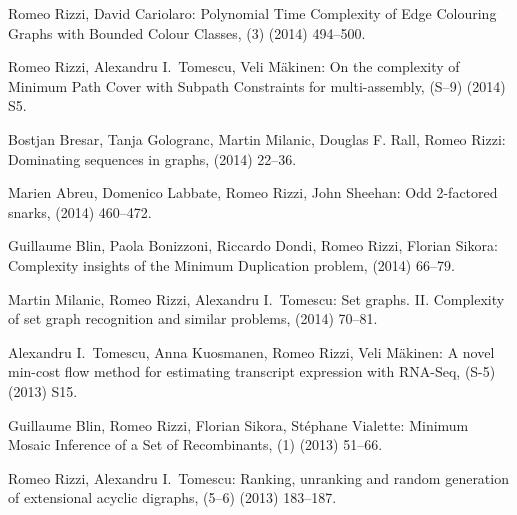 \begin{etaremune}
  \item {\sc Romeo Rizzi, David Cariolaro:}
   \newblock  Polynomial Time Complexity of Edge Colouring Graphs with Bounded Colour Classes,
   (3) (2014) 494--500.

  \item {\sc Romeo Rizzi, Alexandru I.~Tomescu, Veli M\"akinen:}
   \newblock  On the complexity of Minimum Path Cover with Subpath Constraints for multi-assembly,
   (S--9) (2014) S5.

  \item {\sc Bostjan Bresar, Tanja Gologranc, Martin Milanic, Douglas F. Rall, Romeo Rizzi:}
   \newblock  Dominating sequences in graphs,
    (2014) 22--36.

  \item {\sc Marien Abreu, Domenico Labbate, Romeo Rizzi, John Sheehan:}
   \newblock  Odd 2-factored snarks,
    (2014) 460--472.

  \item {\sc Guillaume Blin, Paola Bonizzoni, Riccardo Dondi, Romeo Rizzi, Florian Sikora:}
   \newblock  Complexity insights of the Minimum Duplication problem,
    (2014) 66--79.

  \item {\sc Martin Milanic, Romeo Rizzi, Alexandru I.~Tomescu:}
   \newblock  Set graphs. II. Complexity of set graph recognition and similar problems,
    (2014) 70--81. 

  \item {\sc Alexandru I.~Tomescu, Anna Kuosmanen, Romeo Rizzi, Veli M\"akinen:}
   \newblock  A novel min-cost flow method for estimating transcript expression with RNA-Seq,
   (S-5) (2013) S15. 

  \item {\sc Guillaume Blin, Romeo Rizzi, Florian Sikora, St\'ephane Vialette:}
   \newblock  Minimum Mosaic Inference of a Set of Recombinants,
   (1) (2013) 51--66.

  \item {\sc Romeo Rizzi, Alexandru I.~Tomescu:}
   \newblock  Ranking, unranking and random generation of extensional acyclic digraphs,
   (5--6) (2013) 183--187. 


\end{etaremune}
